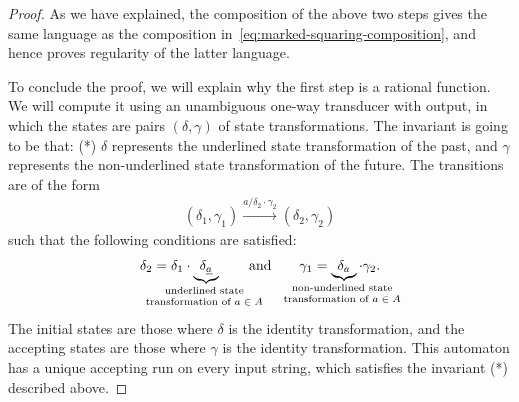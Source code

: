 \begin{proof}
As we have explained, the composition of the above two steps gives the same language as the composition in~\eqref{eq:marked-squaring-composition}, and hence proves regularity of the latter language. 

To conclude the proof, we will explain why the first step is a rational function. We will compute it using an unambiguous one-way transducer with output, in which the states are pairs $(\delta,\gamma)$ of state transformations. The invariant is going to be  that: (*) $\delta$ represents the underlined state transformation of the past, and $\gamma$ represents the non-underlined state transformation of the future. The transitions are of the form 
        \begin{align*}
        (\delta_1,\gamma_1) \xrightarrow {a / \delta_2 \cdot \gamma_2} (\delta_2, \gamma_2)
        \end{align*}
        such that the following conditions are satisfied:
        \begin{align*}
        \delta_2 = \delta_1 \cdot \myunderbrace{\delta_{\underline a}}{underlined state \\ transformation of $a \in A$} \qquad \text{and} \qquad  \gamma_1 = \myunderbrace{\delta_{a}}{non-underlined state \\ transformation of $a \in A$} \cdot \gamma_2.
        \end{align*}
        The initial states are those where $\delta$ is the identity transformation, and the accepting states are those where $\gamma$ is the identity transformation. This automaton has a unique accepting run on every input string, which satisfies the invariant (*) described above.
\end{proof}
     

\exerciseheader

